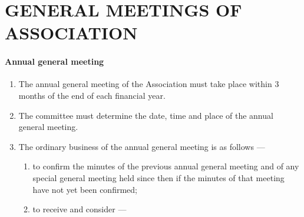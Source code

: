 \documentclass[../constitution.tex]{subfiles}
\begin{document}
\hypertarget{part-6-general-meetings-of-association}{%
\part{GENERAL MEETINGS OF ASSOCIATION}\label{part-6-general-meetings-of-association}}

\hypertarget{annual-general-meeting}{%
\subsection{Annual general meeting}\label{annual-general-meeting}}

\begin{enumerate}

\item The annual general meeting of the Association must take place within 3 months of the end of each financial year.


\item The committee must determine the date, time and place of the annual general meeting.
\item The ordinary business of the annual general meeting is as follows ---

  \begin{enumerate}
  
  \item to confirm the minutes of the previous annual general meeting and of any special general meeting held since then if the minutes of that meeting have not yet been confirmed;
  \item to receive and consider ---

    \begin{enumerate}
    

\end{enumerate}
\end{enumerate}
\end{enumerate}
\end{document}
